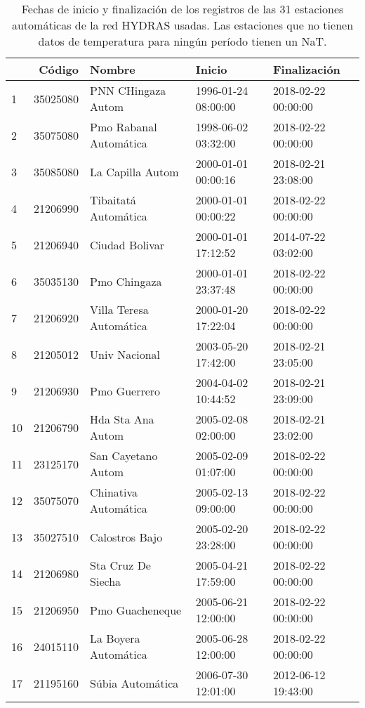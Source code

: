 \begin{table}[H]
\centering
\caption{Fechas de inicio y finalización de los registros de las 31 estaciones automáticas de la red HYDRAS usadas. Las estaciones que no tienen datos de temperatura para ningún período tienen un NaT.}
\label{tab:inicio_final_hydras}
\begin{tabular}{lrlll}
\toprule
{} &       Código &                   Nombre &              Inicio &                 Finalización \\
\midrule
1  &  35025080 &       PNN CHingaza Autom & 1996-01-24 08:00:00 & 2018-02-22 00:00:00 \\
2  &  35075080 &   Pmo Rabanal Automática & 1998-06-02 03:32:00 & 2018-02-22 00:00:00 \\
3  &  35085080 &         La Capilla Autom & 2000-01-01 00:00:16 & 2018-02-21 23:08:00 \\
4  &  21206990 &     Tibaitatá Automática & 2000-01-01 00:00:22 & 2018-02-22 00:00:00 \\
5  &  21206940 &           Ciudad Bolivar & 2000-01-01 17:12:52 & 2014-07-22 03:02:00 \\
6  &  35035130 &             Pmo Chingaza & 2000-01-01 23:37:48 & 2018-02-22 00:00:00 \\
7  &  21206920 &  Villa Teresa Automática & 2000-01-20 17:22:04 & 2018-02-22 00:00:00 \\
8  &  21205012 &            Univ Nacional & 2003-05-20 17:42:00 & 2018-02-21 23:05:00 \\
9  &  21206930 &             Pmo Guerrero & 2004-04-02 10:44:52 & 2018-02-21 23:09:00 \\
10 &  21206790 &        Hda Sta Ana Autom & 2005-02-08 02:00:00 & 2018-02-21 23:02:00 \\
11 &  23125170 &       San Cayetano Autom & 2005-02-09 01:07:00 & 2018-02-22 00:00:00 \\
12 &  35075070 &     Chinativa Automática & 2005-02-13 09:00:00 & 2018-02-22 00:00:00 \\
13 &  35027510 &           Calostros Bajo & 2005-02-20 23:28:00 & 2018-02-22 00:00:00 \\
14 &  21206980 &       Sta Cruz De Siecha & 2005-04-21 17:59:00 & 2018-02-22 00:00:00 \\
15 &  21206950 &          Pmo Guacheneque & 2005-06-21 12:00:00 & 2018-02-22 00:00:00 \\
16 &  24015110 &     La Boyera Automática & 2005-06-28 12:00:00 & 2018-02-22 00:00:00 \\
17 &  21195160 &         Súbia Automática & 2006-07-30 12:01:00 & 2012-06-12 19:43:00 \\

\end{tabular}
\end{table}

